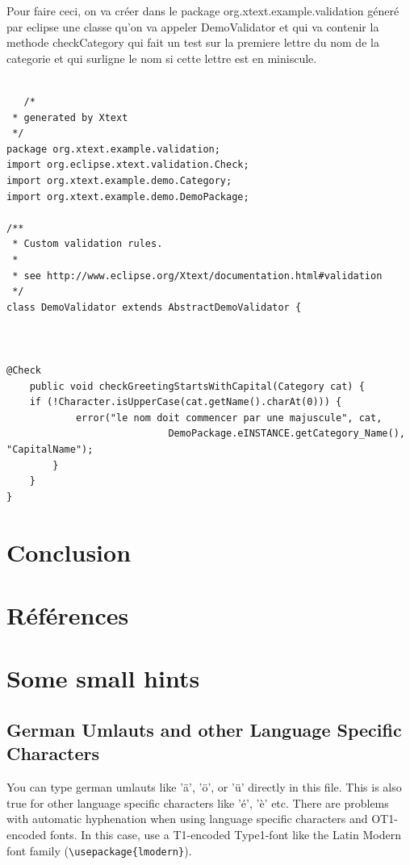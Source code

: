 \documentclass{article}
\begin{document}
{Pour faire ceci, on va créer dans le package org.xtext.example.validation géneré par eclipse une classe qu'on va appeler DemoValidator et qui va contenir la methode checkCategory qui fait un test sur la premiere lettre du nom de la categorie et qui surligne le nom si cette lettre est en miniscule.


\begin{verbatim}

   /*
 * generated by Xtext
 */
package org.xtext.example.validation;
import org.eclipse.xtext.validation.Check;
import org.xtext.example.demo.Category;
import org.xtext.example.demo.DemoPackage;

/**
 * Custom validation rules. 
 *
 * see http://www.eclipse.org/Xtext/documentation.html#validation
 */
class DemoValidator extends AbstractDemoValidator {



@Check
	public void checkGreetingStartsWithCapital(Category cat) {
	if (!Character.isUpperCase(cat.getName().charAt(0))) {
			error("le nom doit commencer par une majuscule", cat,
							DemoPackage.eINSTANCE.getCategory_Name(), "CapitalName");
		}
	}
}

\end{verbatim}






\newpage









\section{Conclusion}
\label{hints}

\section{Références}
\label{hints}
\section{Some small hints}
\label{hints}
\subsection{German Umlauts and other Language Specific Characters}
\label{umlauts}
You can type german umlauts like 'ä', 'ö', or 'ü' directly in this file.
This is also true for other language specific characters like 'é', 'è' etc.
There are problems with automatic hyphenation when using language
specific characters and OT1-encoded fonts. In this case, use a
T1-encoded Type1-font like the Latin Modern font family (\verb#\usepackage{lmodern}#).
}
\end{document}
